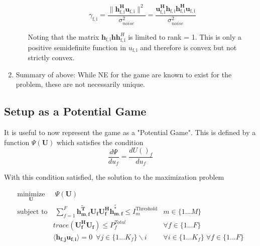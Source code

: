 \documentclass[12pt]{article}
\begin{document}
\begin{enumerate}
\begin{itemize}
	\begin{equation}\label{zf_snr_expanded}
	\gamma_{\mathrm{f,i}} = \frac{\|\mathbf{h^H_{\mathrm{f,i}}u_{\mathrm{f,i}}}\|^2}
	{\sigma^2_{noise}  
	}
	= 
	\frac{\mathbf{u^H_{\mathrm{f,i}}h_{\mathrm{f,i}}h^H_{\mathrm{f,i}}u_{\mathrm{f,i}}}}
	{\sigma^2_{noise}  
	}
	\end{equation}
	
	Noting that the matrix 
	$\mathbf{h}_{\mathrm{f,i}}\mathbf{hh}^H_{\mathrm{f,i}}$
	is limited to rank = 1. This is only a positive semidefinite function in 
	$u_{\mathrm{f,i}}$ and therefore is convex but not strictly convex.

\end{itemize}


\item
Summary of above: 
While NE for the game are known to exist for the problem, these are not necessarily unique. 

\end{enumerate}





\subsection{Setup as a Potential Game}
It is useful to now represent the game as a "Potential Game". This is defined by a function
$ \Psi(\mathbf{U})$ which satisfies the condition
\begin{equation}\label{potential_game_condition}
\frac{d\Psi}{du_f} = \frac{d U()_f}{du_f}
\end{equation}


With this condition satisfied, the solution to the maximization problem 

\begin{subequations}
	\label{optim}
	\begin{align}
	    \underset{\mathbf{U}}{\text{minimize}}
	    & \; \Psi(\mathbf{U}) \label{potential_game} 
	    \\
	    \text{subject to}  & \;
	    \sum^F_{f=1}\mathbf{\tilde{h_{m,f}^T}}  \mathbf{U_f}  \mathbf{U_f^H}
		\mathbf{\tilde{h_{m,f}^*}} \leq I^{\mathrm{Threshold}}_{m} & m \in \{1 ...M\} 
		\label{interference_const_central}\\
        & trace(\mathbf{U_f^H}\mathbf{U_f}) \leq P^{Total}_{f} & \forall f \in \{1 ... F\}
        \label{power_const_central}\\
        & \langle \mathbf{h_{f,j}}\mathbf{u_{f,i}} \rangle =0\ \; \forall j \in \{1... K_f\}				\backslash i &\forall i \in \{1 ... K_f\}\; \forall f \in \{1 ... F\} \label{zf_const_central}
	\end{align}
	\end{subequations}
\end{document}
